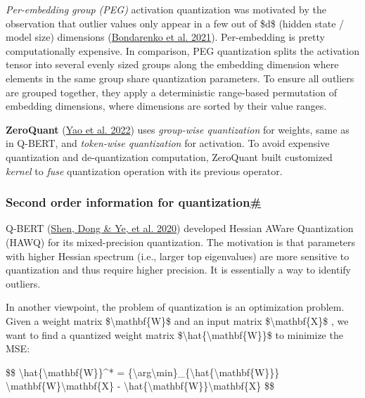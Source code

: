 \emph{Per-embedding group (PEG)} activation quantization was motivated by the observation that outlier values only appear in a few out of \$d\$ (hidden state / model size) dimensions (\href{https://arxiv.org/abs/2109.12948}{Bondarenko et al. 2021}). Per-embedding is pretty computationally expensive. In comparison, PEG quantization splits the activation tensor into several evenly sized groups along the embedding dimension where elements in the same group share quantization parameters. To ensure all outliers are grouped together, they apply a deterministic range-based permutation of embedding dimensions, where dimensions are sorted by their value ranges.

\textbf{ZeroQuant} (\href{https://arxiv.org/abs/2206.01861}{Yao et al. 2022}) uses \emph{group-wise quantization} for weights, same as in Q-BERT, and \emph{token-wise quantization} for activation. To avoid expensive quantization and de-quantization computation, ZeroQuant built customized \emph{kernel} to \emph{fuse} quantization operation with its previous operator.

\subsubsection{\texorpdfstring{Second order information for quantization\hyperref[second-order-information-for-quantization]{\#}}{Second order information for quantization\#}}\label{second-order-information-for-quantization}

Q-BERT (\href{https://arxiv.org/abs/1909.05840}{Shen, Dong \& Ye, et al. 2020}) developed Hessian AWare Quantization (HAWQ) for its mixed-precision quantization. The motivation is that parameters with higher Hessian spectrum (i.e., larger top eigenvalues) are more sensitive to quantization and thus require higher precision. It is essentially a way to identify outliers.

In another viewpoint, the problem of quantization is an optimization problem. Given a weight matrix \$\textbackslash mathbf\{W\}\$ and an input matrix \$\textbackslash mathbf\{X\}\$ , we want to find a quantized weight matrix \$\textbackslash hat\{\textbackslash mathbf\{W\}\}\$ to minimize the MSE:

\$\$ \textbackslash hat\{\textbackslash mathbf\{W\}\}\^{}* = \{\textbackslash arg\textbackslash min\}\_\{\textbackslash hat\{\textbackslash mathbf\{W\}\}\} \textbar{} \textbackslash mathbf\{W\}\textbackslash mathbf\{X\} - \textbackslash hat\{\textbackslash mathbf\{W\}\}\textbackslash mathbf\{X\}\textbar{} \$\$

